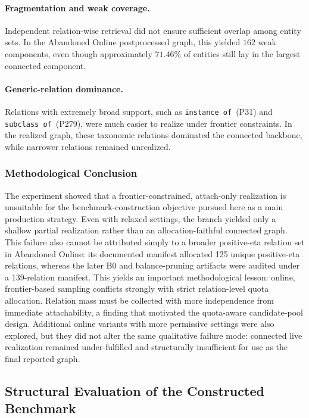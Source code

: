 \documentclass[12pt,a4paper]{article}
\begin{document}
\paragraph{Fragmentation and weak coverage.} Independent relation-wise retrieval did not ensure sufficient overlap among entity sets. In the Abandoned Online postprocessed graph, this yielded \(162\) weak components, even though approximately \(71.46\%\) of entities still lay in the largest connected component.

\paragraph{Generic-relation dominance.} Relations with extremely broad support, such as \texttt{instance of}~(P31) and \texttt{subclass of}~(P279), were much easier to realize under frontier constraints. In the realized graph, these taxonomic relations dominated the connected backbone, while narrower relations remained unrealized.

\subsubsection{Methodological Conclusion}
The experiment showed that a frontier-constrained, attach-only realization is unsuitable for the benchmark-construction objective pursued here as a main production strategy. Even with relaxed settings, the branch yielded only a shallow partial realization rather than an allocation-faithful connected graph. This failure also cannot be attributed simply to a broader positive-eta relation set in Abandoned Online: its documented manifest allocated 125 unique positive-eta relations, whereas the later B0 and balance-pruning artifacts were audited under a 139-relation manifest. This yields an important methodological lesson: online, frontier-based sampling conflicts strongly with strict relation-level quota allocation. Relation mass must be collected with more independence from immediate attachability, a finding that motivated the quota-aware candidate-pool design. Additional online variants with more permissive settings were also explored, but they did not alter the same qualitative failure mode: connected live realization remained under-fulfilled and structurally insufficient for use as the final reported graph.

\subsection{Structural Evaluation of the Constructed Benchmark}
\label{sec:discussion}
\end{document}
